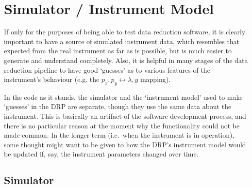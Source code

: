 \section{Simulator / Instrument Model}

If only for the purposes of being able to test data reduction software,
it is clearly important to have a source of simulated instrument data,
which resembles that expected from the real instrument as far as is
possible, but is much easier to generate and understand completely.
Also, it is helpful in many stages of the data reduction pipeline to
have good `guesses' as to various features of the instrument's behaviour
(e.g. the $p_x, p_y \leftrightarrow \lambda, y$ mapping).

In the code as it stands, the simulator and the `instrument model' used
to make `guesses' in the DRP are separate, though they use the same data
about the instrument. This is basically an artifact of the software
development process, and there is no particular reason at the moment why
the functionality could not be made common. In the longer term (i.e.\
when the instrument is in operation), some thought might want to be
given to how the DRP's instrument model would be updated if, say, the
instrument parameters changed over time.

\subsection{Simulator}

